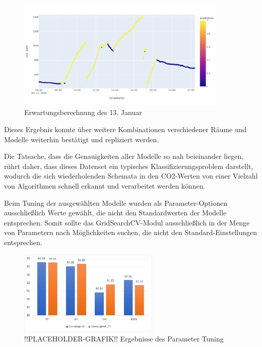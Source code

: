 \begin{figure}[h]
    \centering
    \includegraphics[width=0.9\textwidth]{pic/nov23_predicted.png}
    \caption{Erwartungsberechnung des 13. Januar}
    \label{fig:nov23_pred}
\end{figure}

Dieses Ergebnis konnte über weitere Kombinationen verschiedener Räume und Modelle weiterhin
bestätigt und repliziert werden. 

\newpage
Die Tatsache, dass die Genauigkeiten aller Modelle so nah beieinander 
liegen, rührt daher, dass dieses Datenset ein typisches Klassifizierungsproblem darstellt,
wodurch die sich wiederholenden Schemata in den CO2-Werten von einer Vielzahl von Algorithmen schnell 
erkannt und verarbeitet werden können.

Beim Tuning der ausgewählten Modelle wurden als Parameter-Optionen ausschließlich Werte gewählt, die nicht 
den Standardwerten der Modelle entsprechen. Somit sollte das GridSearchCV-Modul ausschließlich in der Menge 
von Parametern nach Möglichkeiten suchen, die nicht den Standard-Einstellungen entsprechen.

\begin{figure}[h]
    \centering
    \includegraphics[width=0.6\textwidth]{pic/param_eval.png}
    \caption{!!PLACEHOLDER-GRAFIK!! Ergebnisse des Parameter Tuning}
    \label{fig:PT_eval}
\end{figure}


